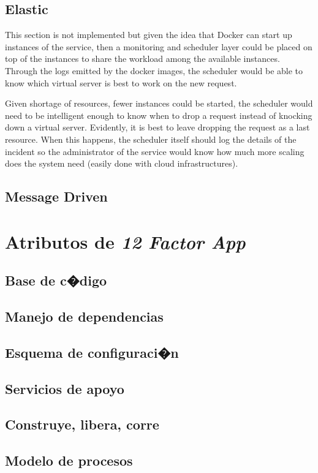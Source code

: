 \documentclass[10pt]{article}
\begin{document}
 \subsection{Elastic} %
 
This section is not implemented but given the idea that Docker can start up instances of the service, then a monitoring and scheduler layer could be placed on top of the instances to share the workload among the available instances. Through the logs emitted by the docker images, the scheduler would be able to know which virtual server is best to work on the new  request.

Given shortage of resources, fewer instances could be started, the scheduler would need to be intelligent enough to know when to drop a request instead of knocking down a virtual server. Evidently, it is best to leave dropping the request as a last resource. When this happens, the scheduler itself should log the details of the incident so the administrator of the service would know how much more scaling does the system need (easily done with cloud infrastructures).
 
 \subsection{Message Driven}
 
\section{Atributos de {\em 12 Factor App}}
 \subsection{Base de c�digo}
 \subsection{Manejo de dependencias}
 \subsection{Esquema de configuraci�n}
 \subsection{Servicios de apoyo}
 \subsection{Construye, libera, corre}
 \subsection{Modelo de procesos}
\end{document}
